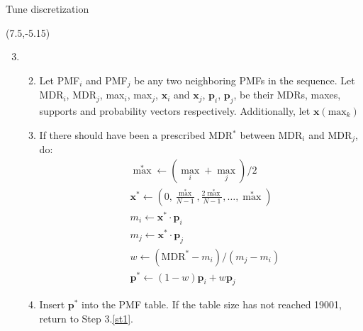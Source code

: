 \documentclass[aspectratio=169]{beamer}
\begin{document}
\begin{frame}{Tune discretization}
\begin{textblock}{7.75}
\begin{enumerate}
\begin{enumerate}
\end{enumerate}
\end{enumerate}
\end{textblock}


\begin{textblock}{7}(7.5,-5.15)

\begin{enumerate}\setcounter{enumi}{2}

\tiny\item \hspace{1em}\medskip

\begin{enumerate}\setcounter{enumii}{1}

\tiny\item\label{st1} Let PMF$_i$ and PMF$_j$ be any two neighboring PMFs in the sequence. Let MDR$_i$, MDR$_j$, max$_i$, max$_j$, $\boldsymbol{x}_i$ and $\boldsymbol{x}_j$, $\boldsymbol{p}_i$, $\boldsymbol{p}_j$,  be their MDRs, maxes, supports and probability vectors respectively. Additionally, let $\boldsymbol{x}(\text{max}_k)$\medskip

\tiny\item If there should have been a prescribed MDR$^*$ between MDR$_i$ and MDR$_j$, do:\begin{equation*}
\begin{split}
&{\max}^*\gets \left({\max}_i + {\max}_j\right) / 2\\
&\boldsymbol{x}^*\gets\left(0,\frac{{\max}^*}{N-1}, \frac{2{\max}^*}{N-1},\ldots,{\max}^*\right)\\
&m_i\gets \boldsymbol{x}^*\cdot \boldsymbol{p}_i\\
&m_j\gets \boldsymbol{x}^*\cdot \boldsymbol{p}_j\\
&w\gets (\text{MDR}^* - m_i) / (m_j - m_i)\\
&\boldsymbol{p}^*\gets (1-w)\boldsymbol{p}_i + w\boldsymbol{p}_j
\end{split}
\end{equation*}\item Insert $\boldsymbol{p}^*$ into the PMF table. If the table size has not reached 19001, return to Step 3.\ref{st1}.

\end{enumerate}

\end{enumerate}

\end{textblock}



\end{frame}
\end{document}
